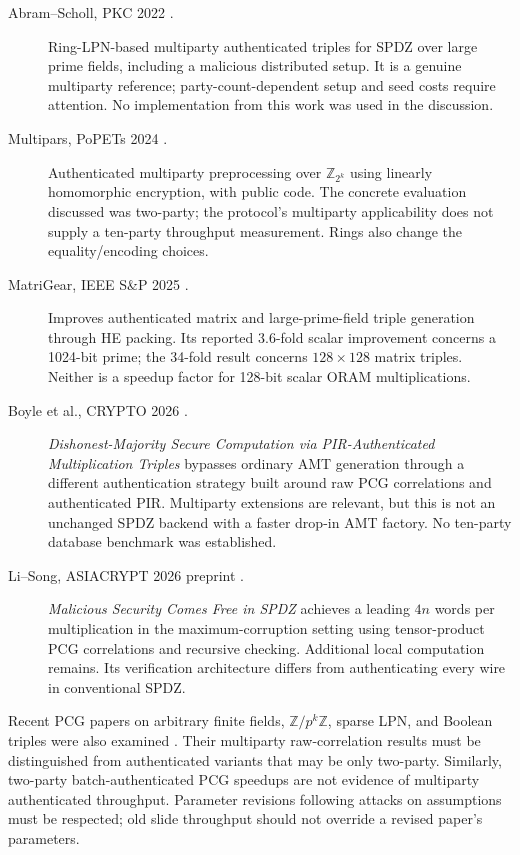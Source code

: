 \documentclass[11pt]{article}
\begin{document}
\begin{description}
\item[Abram--Scholl, PKC 2022 \cite{abramscholl}.]
Ring-LPN-based multiparty authenticated triples for SPDZ over large prime fields,
including a malicious distributed setup. It is a genuine multiparty reference;
party-count-dependent setup and seed costs require attention. No implementation
from this work was used in the discussion.
\item[Multipars, PoPETs 2024 \cite{multipars}.]
Authenticated multiparty preprocessing over $\mathbb Z_{2^k}$ using linearly
homomorphic encryption, with public code. The concrete evaluation discussed was
two-party; the protocol's multiparty applicability does not supply a ten-party
throughput measurement. Rings also change the equality/encoding choices.
\item[MatriGear, IEEE S\&P 2025 \cite{matrigear}.]
Improves authenticated matrix and large-prime-field triple generation through
HE packing. Its reported 3.6-fold scalar improvement concerns a 1024-bit prime;
the 34-fold result concerns $128\times128$ matrix triples. Neither is a speedup
factor for 128-bit scalar ORAM multiplications.
\item[Boyle et al., CRYPTO 2026 \cite{pirauth2026}.]
\emph{Dishonest-Majority Secure Computation via PIR-Authenticated Multiplication
Triples} bypasses ordinary AMT generation through a different authentication
strategy built around raw PCG correlations and authenticated PIR. Multiparty
extensions are relevant, but this is not an unchanged SPDZ backend with a faster
drop-in AMT factory. No ten-party database benchmark was established.
\item[Li--Song, ASIACRYPT 2026 preprint \cite{free2026}.]
\emph{Malicious Security Comes Free in SPDZ} achieves a leading $4n$ words per
multiplication in the maximum-corruption setting using tensor-product PCG
correlations and recursive checking. Additional local computation remains.
Its verification architecture differs from authenticating every wire in
conventional SPDZ.
\end{description}

Recent PCG papers on arbitrary finite fields, $\mathbb Z/p^k\mathbb Z$, sparse
LPN, and Boolean triples were also examined \cite{pcgfield2025,pcgring2025,
pcfsparse2025,pcgf22025}. Their multiparty raw-correlation results must be
distinguished from authenticated variants that may be only two-party. Similarly,
two-party batch-authenticated PCG speedups \cite{batchauth2026} are not evidence
of multiparty authenticated throughput. Parameter revisions following attacks
on assumptions must be respected; old slide throughput should not override a
revised paper's parameters.
\end{document}
